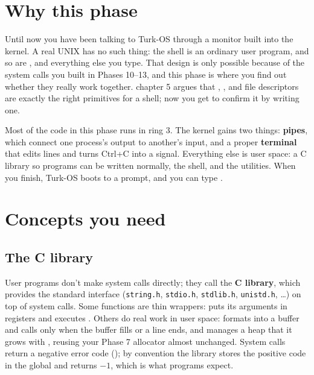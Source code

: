 \documentclass[11pt,a4paper]{article}
\begin{document}


\section{Why this phase}

Until now you have been talking to Turk-OS through a monitor built into the kernel. A real UNIX has no such thing: the
shell is an ordinary user program, and so are ,  and everything else you type. That design is only
possible because of the system calls you built in Phases 10--13, and this phase is where you find out whether they
really work together. \OSTEP chapter 5 argues that , ,  and file descriptors are
exactly the right primitives for a shell; now you get to confirm it by writing one.

Most of the code in this phase runs in ring 3. The kernel gains two things: \textbf{pipes}, which connect one
process's output to another's input, and a proper \textbf{terminal} that edits lines and turns Ctrl+C into a signal.
Everything else is user space: a C library so programs can be written normally, the shell, and the utilities. When
you finish, Turk-OS boots to a prompt, and you can type .

\section{Concepts you need}

\subsection{The C library}

User programs don't make system calls directly; they call the \textbf{C library}, which provides the standard
interface (\texttt{string.h}, \texttt{stdio.h}, \texttt{stdlib.h}, \texttt{unistd.h}, \dots) on top of system calls.
Some functions are thin wrappers:  puts its arguments in registers and executes . Others do
real work in user space:  formats into a buffer and calls  only when the buffer fills or a
line ends, and  manages a heap that it grows with , reusing your Phase 7 allocator almost
unchanged. System calls return a negative error code (); by convention the library stores the positive
code in the global  and returns $-1$, which is what programs expect.
\end{document}

